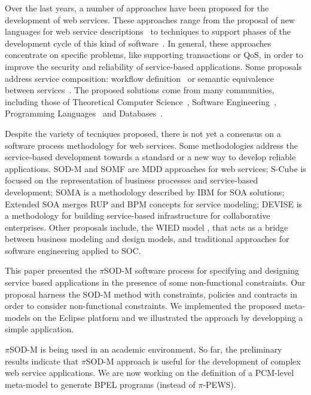 Over the last years, a number of approaches have been proposed for the
development of web services. These approaches range from the proposal of new 
languages for web service descriptions~\cite{bpel03,SBS04} 
to techniques to support phases of the development cycle of this kind of
software~\cite{lipari2007,BianculliGSBG07}. In general, these
approaches concentrate on specific problems, like supporting transactions or
QoS, in order to improve the security and reliability of service-based
applications. Some proposals address service composition: workflow
definition~\cite{AalstHKB03,MuP06} or semantic equivalence between
services~\cite{BHM06}. The proposed solutions come from many communities, 
including those of Theoretical Computer Science~\cite{VA05,GGP08}, 
Software Engineering~\cite{Aal03,MendesPDB09}, Programming
Languages~\cite{MPC08,bpel03} and Databases~\cite{ABM01}.

Despite the variety of tecniques proposed, there is not yet a consensus on a software
process methodology for web services. Some methodologies address the service-based 
development towards a standard or a new way to develop reliable applications. 
SOD-M and SOMF \cite{somf} are MDD approaches for web services; 
S-Cube \cite{scube2010book} is focused on the representation of business processes and 
service-based development; SOMA \cite{soma} is a methodology described by IBM
for SOA solutions; Extended SOA \cite{PapazoglouH06} merges RUP and
BPM\cite{bpm} concepts for service modeling; DEVISE \cite{DEVISE} is a
methodology for building service-based infrastructure for collaborative
enterprises. Other proposals include, the WIED model \cite{TongrungrojanaL04}, 
that acts as a bridge between business modeling and design models, and traditional 
approaches for software engineering \cite{sommerville08} applied to SOC. 

\bigskip

This paper presented the $\pi$SOD-M software process for specifying and designing service based applications in the presence of some non-functional constraints. 
Our proposal harness the SOD-M method with constraints, policies and contracts in order to consider non-functional constraints.
We implemented the proposed meta-models on the Eclipse platform and we illustrated the approach by developping a simple application.

$\pi$SOD-M is being used in an academic environment.
So far, the preliminary results indicate that $\pi$SOD-M approach is useful for the development of complex web service applications. 
We are now working on the definition of a PCM-level meta-model to generate BPEL programs (instead of $\pi$-PEWS). 
